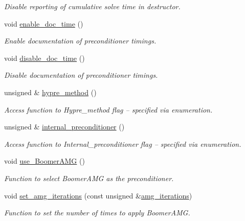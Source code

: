 \begin{DoxyCompactItemize}
\begin{DoxyCompactList}\small\item\em Disable reporting of cumulative solve time in destructor. \end{DoxyCompactList}\item 
void \hyperlink{classoomph_1_1HyprePreconditioner_a73e679c8139564265a8c6786a112269b}{enable\+\_\+doc\+\_\+time} ()
\begin{DoxyCompactList}\small\item\em Enable documentation of preconditioner timings. \end{DoxyCompactList}\item 
void \hyperlink{classoomph_1_1HyprePreconditioner_a7b28624e54907dc5081484842b8b8530}{disable\+\_\+doc\+\_\+time} ()
\begin{DoxyCompactList}\small\item\em Disable documentation of preconditioner timings. \end{DoxyCompactList}\item 
unsigned \& \hyperlink{classoomph_1_1HyprePreconditioner_a62f977047d4b26a11da2bb7c98beeaca}{hypre\+\_\+method} ()
\begin{DoxyCompactList}\small\item\em Access function to Hypre\+\_\+method flag -- specified via enumeration. \end{DoxyCompactList}\item 
unsigned \& \hyperlink{classoomph_1_1HyprePreconditioner_aa7396f1be54c31883c25e5d89f0af681}{internal\+\_\+preconditioner} ()
\begin{DoxyCompactList}\small\item\em Access function to Internal\+\_\+preconditioner flag -- specified via enumeration. \end{DoxyCompactList}\item 
void \hyperlink{classoomph_1_1HyprePreconditioner_aa120789b545e8562d24a7e4f8799715f}{use\+\_\+\+Boomer\+A\+MG} ()
\begin{DoxyCompactList}\small\item\em Function to select Boomer\+A\+MG as the preconditioner. \end{DoxyCompactList}\item 
void \hyperlink{classoomph_1_1HyprePreconditioner_a4b0afe4dc57ca9764200c2755ce27dd5}{set\+\_\+amg\+\_\+iterations} (const unsigned \&\hyperlink{classoomph_1_1HyprePreconditioner_a1fa211b49730947fe525156d08b66da4}{amg\+\_\+iterations})
\begin{DoxyCompactList}\small\item\em Function to set the number of times to apply Boomer\+A\+MG. \end{DoxyCompactList}\item 

\end{DoxyCompactItemize}
